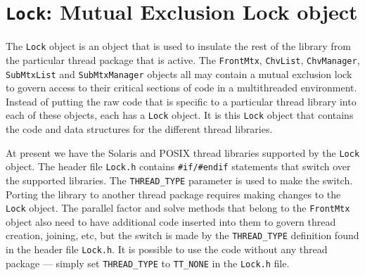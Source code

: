 \par
\chapter{{\tt Lock}: Mutual Exclusion Lock object}
\label{chapter:Lock}
\par
The {\tt Lock} object is an object that is used to insulate the
rest of the library from the particular thread package that is
active.
The {\tt FrontMtx}, {\tt ChvList}, {\tt ChvManager},
{\tt SubMtxList} and {\tt SubMtxManager} objects all
may contain a mutual exclusion lock to govern access to their
critical sections of code in a multithreaded environment.
Instead of putting the raw code that is specific to a particular
thread library into each of these objects, 
each has a {\tt Lock} object.
It is this {\tt Lock} object that contains the code and data
structures for the different thread libraries.
\par
At present we have the Solaris and POSIX thread libraries supported
by the {\tt Lock} object.
The header file {\tt Lock.h} contains {\tt \#if/\#endif} statements
that switch over the supported libraries.
The {\tt THREAD\_TYPE} parameter is used to make the switch.
Porting the library to another thread package requires making
changes to the {\tt Lock} object.
The parallel factor and solve methods that belong to the 
{\tt FrontMtx} object also need to have additional code inserted into
them to govern thread creation, joining, etc, but the switch is
made by the {\tt THREAD\_TYPE} definition found in the header file
{\tt Lock.h}.
It is possible to use the code without any thread package ---
simply set {\tt THREAD\_TYPE} to {\tt TT\_NONE} in the {\tt Lock.h}
file.
